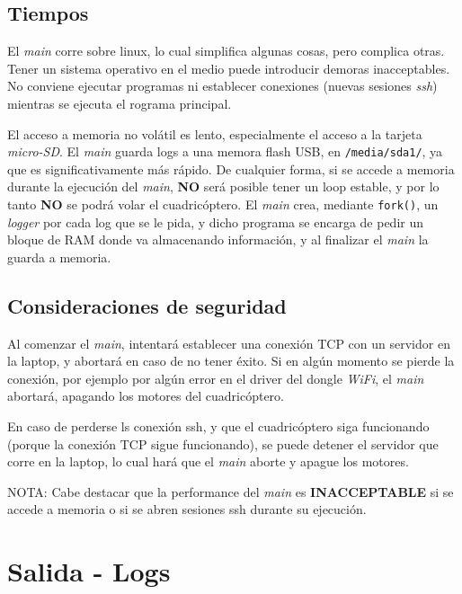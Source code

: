 \documentclass[main]{subfiles}
\begin{document}
\subsection{Tiempos}
\label{sec:codigo:tiempos}

El \textit{main} corre sobre linux, lo cual simplifica algunas cosas, pero complica otras. Tener un sistema operativo en el medio puede introducir demoras inacceptables. No conviene ejecutar programas ni establecer conexiones (nuevas sesiones \textit{ssh}) mientras se ejecuta el rograma principal.

El acceso a memoria no volátil es lento, especialmente el acceso a la tarjeta \textit{micro-SD}. El \textit{main} guarda logs a una memora flash USB, en \verb+/media/sda1/+, ya que es significativamente más rápido. De cualquier forma, si se accede a memoria durante la ejecución del \textit{main}, \textbf{NO} será posible tener un loop estable, y por lo tanto \textbf{NO} se podrá volar el cuadricóptero. El \textit{main} crea, mediante \verb+fork()+, un \textit{logger} por cada log que se le pida, y dicho programa se encarga de pedir un bloque de RAM donde va almacenando información, y al finalizar el \textit{main} la guarda a memoria.

\subsection{Consideraciones de seguridad}
\label{sec:codigo:consideraciones-de-seguridad}

Al comenzar el \textit{main}, intentará establecer una conexión TCP con un servidor en la laptop, y abortará en caso de no tener éxito. Si en algún momento se pierde la conexión, por ejemplo por algún error en el driver del dongle \textit{WiFi}, el \textit{main} abortará, apagando los motores del cuadricóptero.

En caso de perderse ls conexión ssh, y que el cuadricóptero siga funcionando (porque la conexión TCP sigue funcionando), se puede detener el servidor que corre en la laptop, lo cual hará que el \textit{main} aborte y apague los motores.

NOTA: Cabe destacar que la performance del \textit{main} es \textbf{INACCEPTABLE} si se accede a memoria o si se abren sesiones ssh durante su ejecución.

\section{Salida - Logs}
\label{salidas-logs}
\end{document}
